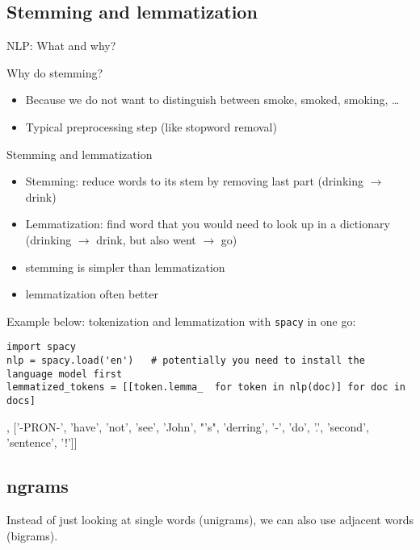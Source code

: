 	

\subsection{Stemming and lemmatization}


\begin{frame}{NLP: What and why?}
	\begin{block}{Why do stemming?}
		\begin{itemize}
			\item Because we do not want to distinguish between smoke, smoked, smoking, \ldots
			\item Typical preprocessing step (like stopword removal)
		\end{itemize}
	\end{block}
\end{frame}

\begin{frame}[fragile]{Stemming and lemmatization}
	\begin{itemize}
		\item Stemming: reduce words to its stem by removing last part (drinking $\rightarrow$ drink)
		\item Lemmatization: find word that you would need to look up in a dictionary (drinking $\rightarrow$ drink, but also went $\rightarrow$ go)
		\item stemming is simpler than lemmatization
		\item lemmatization often better
	\end{itemize}
	\pause
	
	Example below: tokenization and lemmatization with \texttt{spacy} in one go:
	\begin{lstlisting}
import spacy
nlp = spacy.load('en')   # potentially you need to install the language model first
lemmatized_tokens = [[token.lemma_  for token in nlp(doc)] for doc in docs]
	\end{lstlisting}
	\begin{lstlistingoutputtiny}
[['this', 'be', 'a', 'text'], ['-PRON-', 'have', 'not', 'see', 'John', "'s", 'derring', '-', 'do', '.', 'second', 'sentence', '!']]
	\end{lstlistingoutputtiny}
\end{frame}


\subsection{ngrams}
\begin{frame}
	Instead of just looking at single words (unigrams), we can also use adjacent words (bigrams).
\end{frame}

